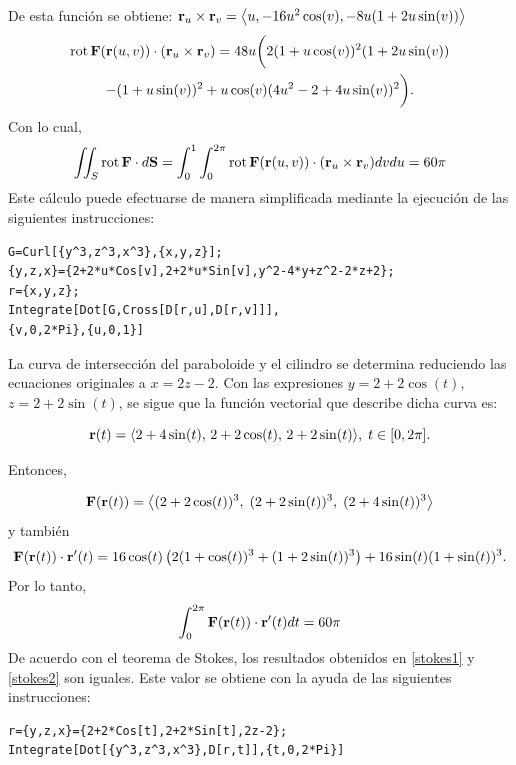 De esta función se obtiene:
${\bf r}_u \times {\bf r}_v=\left \langle u,-16u^2\cos(v),-8u(1+2u\sin(v)) \right \rangle$
\begin{multline*}
{\rm rot\,}{\bf F}({\bf r}(u,v)) \cdot ({\bf r}_u \times {\bf r}_v) = 48u\bigg(2(1+u\cos(v))^2(1+2u\sin(v))\\ -(1+u\sin(v))^2
+u\cos(v)(4u^2-2+4u\sin(v))^2 \bigg ).
\end{multline*}
Con lo cual,
\begin{equation} \label{stokes1}
\iint_S {\rm rot\,}{\bf F}\cdot d{\bf S}=\int_0^1\int_0^{2\pi}{\rm rot\,}{\bf F}({\bf r}(u,v))\cdot({\bf r}_u\times{\bf r}_v) dvdu = 60 \pi
\end{equation}
Este cálculo puede efectuarse de manera simplificada mediante la ejecución de las siguientes instrucciones:

\begin{tcolorbox}[title=\bf Instrucción \verb"Mathematica"]\begin{Verbatim}[formatcom=\letraverbatim]
G=Curl[{y^3,z^3,x^3},{x,y,z}];
{y,z,x}={2+2*u*Cos[v],2+2*u*Sin[v],y^2-4*y+z^2-2*z+2};
r={x,y,z};
Integrate[Dot[G,Cross[D[r,u],D[r,v]]],
{v,0,2*Pi},{u,0,1}]
\end{Verbatim}
\end{tcolorbox}

La curva de intersección del paraboloide y el cilindro se determina reduciendo las ecuaciones originales a
$x = 2z - 2$. Con las expresiones $y = 2 + 2\cos(t)$, $z = 2 + 2\sin(t)$, se sigue que la función vectorial que describe dicha curva es:

{\small
\[{\bf r}(t) = \left\langle 2 + 4\sin(t),\, 2 + 2\cos(t),\, 2 + 2\sin(t) \right\rangle\!,\; t \in [0, 2\pi].\]}

Entonces,

{\small
\[
{\bf F}({\bf r}(t)) =
\left\langle
(2 + 2\cos(t))^3,\;
(2 + 2\sin(t))^3,\;
(2 + 4\sin(t))^3
\right\rangle
\]
}
y también
{\small
\[
{\bf F}({\bf r}(t)) \cdot {\bf r}'(t) =
16\cos(t)\left(2(1 + \cos(t))^3 + (1 + 2\sin(t))^3\right)
+ 16\sin(t)(1 + \sin(t))^3.
\]
}
Por lo tanto,
\begin{equation} \label{stokes2}
\int_0 ^{2\pi}{\bf F}({\bf r}(t)) \cdot{\bf r}'(t) dt = 60 \pi
\end{equation}
De acuerdo con el teorema de Stokes, los resultados obtenidos en \ref{stokes1} y \ref{stokes2} son iguales.
Este valor se obtiene con la ayuda de las siguientes instrucciones:

\begin{tcolorbox}[title=\bf Instrucción \verb"Mathematica"]\begin{Verbatim}[formatcom=\letraverbatim]
r={y,z,x}={2+2*Cos[t],2+2*Sin[t],2z-2};
Integrate[Dot[{y^3,z^3,x^3},D[r,t]],{t,0,2*Pi}]
\end{Verbatim}
\end{tcolorbox}

